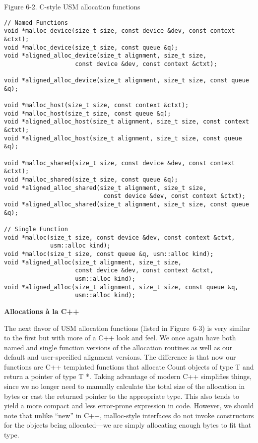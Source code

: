 \hspace*{\fill} \par %
Figure 6-2. C-style USM allocation functions
\begin{lstlisting}[caption={}]
// Named Functions
void *malloc_device(size_t size, const device &dev, const context &ctxt);
void *malloc_device(size_t size, const queue &q);
void *aligned_alloc_device(size_t alignment, size_t size,
					const device &dev, const context &ctxt);

void *aligned_alloc_device(size_t alignment, size_t size, const queue &q);

void *malloc_host(size_t size, const context &ctxt);
void *malloc_host(size_t size, const queue &q);
void *aligned_alloc_host(size_t alignment, size_t size, const context
&ctxt);
void *aligned_alloc_host(size_t alignment, size_t size, const queue &q);

void *malloc_shared(size_t size, const device &dev, const context &ctxt);
void *malloc_shared(size_t size, const queue &q);
void *aligned_alloc_shared(size_t alignment, size_t size,
							const device &dev, const context &ctxt);
void *aligned_alloc_shared(size_t alignment, size_t size, const queue &q);

// Single Function
void *malloc(size_t size, const device &dev, const context &ctxt,
			 usm::alloc kind);
void *malloc(size_t size, const queue &q, usm::alloc kind);
void *aligned_alloc(size_t alignment, size_t size,
					const device &dev, const context &ctxt,
					usm::alloc kind);
void *aligned_alloc(size_t alignment, size_t size, const queue &q,
					usm::alloc kind);
\end{lstlisting}

\hspace*{\fill} \par %
\textbf{Allocations à la C++}

The next flavor of USM allocation functions (listed in Figure 6-3) is very similar to the first but with more of a C++ look and feel. We once again have both named and single function versions of the allocation routines as well as our default and user-specified alignment versions. The difference is that now our functions are C++ templated functions that allocate Count objects of type T and return a pointer of type T *. Taking advantage of modern C++ simplifies things, since we no longer need to manually calculate the total size of the allocation in bytes or cast the returned pointer to the appropriate type. This also tends to yield a more compact and less error-prone expression in code. However, we should note that unlike “new” in C++, malloc-style interfaces do not invoke constructors for the objects being allocated—we are simply allocating enough bytes to fit that type.\par

